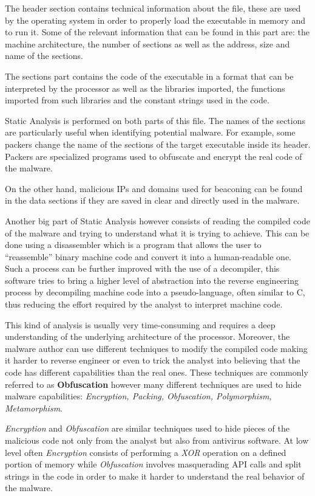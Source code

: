 The header section contains technical information about the file, these are used by the operating system in order to properly load the executable in memory and to run it. Some of the relevant information that can be found in this part are: the machine architecture, the number of sections as well as the address, size and name of the sections.

The sections part contains the code of the executable in a format that can be interpreted by the processor as well as the libraries imported, the functions imported from such libraries and the constant strings used in the code.

Static Analysis is performed on both parts of this file. The names of the sections are particularly useful when identifying potential malware. For example, some packers change the name of the sections of the target executable inside its header. Packers are specialized programs used to obfuscate and encrypt the real code of the malware.

 On the other hand, malicious IPs and domains used for beaconing can be found in the data sections if they are saved in clear and directly used in the malware.  

Another big part of Static Analysis however consists of reading the compiled code of the malware and trying to understand what it is trying to achieve. This can be done using a disassembler which is a program that allows the user to ``reassemble'' binary machine code and convert it into a human-readable one. Such a process can be further improved with the use of a decompiler, this software tries to bring a higher level of abstraction into the reverse engineering process by decompiling machine code into a pseudo-language, often similar to C, thus reducing the effort required by the analyst to interpret machine code.

This kind of analysis is usually very time-consuming and requires a deep understanding of the underlying architecture of the processor. Moreover, the malware author can use different techniques to modify the compiled code making it harder to reverse engineer or even to trick the analyst into believing that the code has different capabilities than the real ones. These techniques are commonly referred to as \textbf{Obfuscation} however many different techniques are used to hide malware capabilities: \textit{Encryption, Packing, Obfuscation, Polymorphism, Metamorphism}.~\cite{Ye2017ASO}

\textit{Encryption} and \textit{Obfuscation} are similar techniques used to hide pieces of the malicious code not only from the analyst but also from antivirus software. At low level often \textit{Encryption} consists of performing a \textit{XOR} operation on a defined portion of memory while \textit{Obfuscation} involves masquerading API calls and split strings in the code in order to make it harder to understand the real behavior of the malware.

